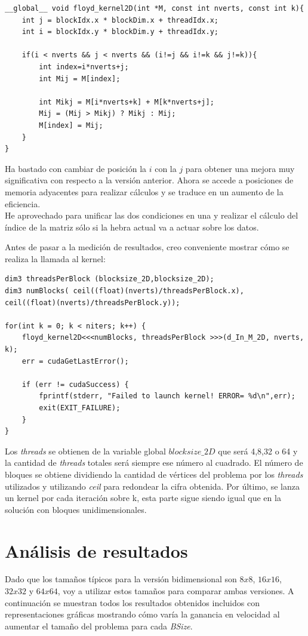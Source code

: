 \begin{verbatim}
__global__ void floyd_kernel2D(int *M, const int nverts, const int k){
	int j = blockIdx.x * blockDim.x + threadIdx.x;
	int i = blockIdx.y * blockDim.y + threadIdx.y;
	
	if(i < nverts && j < nverts && (i!=j && i!=k && j!=k)){
		int index=i*nverts+j;
		int Mij = M[index];
		
		int Mikj = M[i*nverts+k] + M[k*nverts+j];
		Mij = (Mij > Mikj) ? Mikj : Mij;
		M[index] = Mij;
	}
}
\end{verbatim}

Ha bastado con cambiar de posición la $i$ con la $j$ para obtener una mejora muy significativa con respecto a la versión anterior. Ahora se accede a posiciones de memoria adyacentes para realizar cálculos y se traduce en un aumento de la eficiencia.\\
He aprovechado para unificar las dos condiciones en una y realizar el cálculo del índice de la matriz sólo si la hebra actual va a actuar sobre los datos.

Antes de pasar a la medición de resultados, creo conveniente mostrar cómo se realiza la llamada al kernel:

\begin{verbatim}
dim3 threadsPerBlock (blocksize_2D,blocksize_2D);
dim3 numBlocks( ceil((float)(nverts)/threadsPerBlock.x),
ceil((float)(nverts)/threadsPerBlock.y));

for(int k = 0; k < niters; k++) {
	floyd_kernel2D<<<numBlocks, threadsPerBlock >>>(d_In_M_2D, nverts, k);
	err = cudaGetLastError();
	
	if (err != cudaSuccess) {
		fprintf(stderr, "Failed to launch kernel! ERROR= %d\n",err);
		exit(EXIT_FAILURE);
	}
}
\end{verbatim}

Los \textit{threads} se obtienen de la variable global $blocksize\_2D$ que será 4,8,32 o 64 y la cantidad de \textit{threads} totales será siempre ese número al cuadrado.
El número de bloques se obtiene dividiendo la cantidad de vértices del problema por los \textit{threads} utilizados y utilizando \textit{ceil} para redondear la cifra obtenida.
Por último, se lanza un kernel por cada iteración sobre k, esta parte sigue siendo igual que en la solución con bloques unidimensionales.

\section{Análisis de resultados}
Dado que los tamaños típicos para la versión bidimensional son $8x8$, $16x16$, $32x32$ y $64x64$, voy a utilizar estos tamaños para comparar ambas versiones. A continuación se muestran todos los resultados obtenidos incluidos con representaciones gráficas mostrando cómo varía la ganancia en velocidad al aumentar el tamaño del problema para cada \textit{BSize}.

